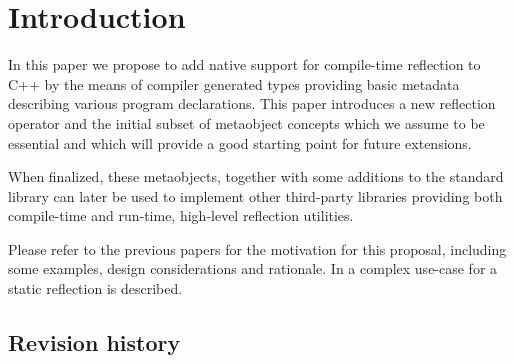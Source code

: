 \section{Introduction}

In this paper we propose to add native support for
compile-time reflection to C++ by the means of compiler generated
types providing basic metadata describing various program declarations.
This paper introduces a new reflection operator and the initial subset
of metaobject concepts which we assume to be essential
and which will provide a good starting point for future extensions.

When finalized, these metaobjects, together with some additions to the standard
library can later be used to implement other third-party libraries
providing both compile-time and run-time, high-level reflection utilities.

Please refer to the previous papers \cite{n3996,n4111,n4451,n4452}
for the motivation for this proposal, including some examples,
design considerations and rationale. In \cite{ITFPWTHOR} a complex use-case
for a static reflection is described.

\subsection{Revision history}

